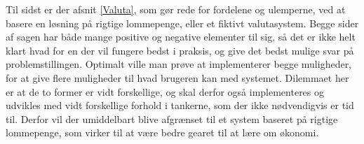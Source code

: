 Til sidst er der afsnit \ref{Valuta}, som gør rede for fordelene og ulemperne, ved at basere en løsning på rigtige lommepenge, eller et fiktivt valutasystem. Begge sider af sagen har både mange positive og negative elementer til sig, så det er ikke helt klart hvad for en der vil fungere bedst i praksis, og give det bedst mulige svar på problemstillingen. Optimalt ville man prøve at implementerer begge muligheder, for at give flere muligheder til hvad brugeren kan med systemet. Dilemmaet her er at de to former er vidt forskellige, og skal derfor også implementeres og udvikles med vidt forskellige forhold i tankerne, som der ikke nødvendigvis er tid til. Derfor vil der umiddelbart blive afgrænset til et system baseret på rigtige lommepenge, som virker til at være bedre gearet til at lære om økonomi.